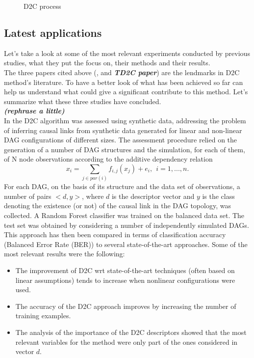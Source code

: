 \begin{figure}[!h]
  
  \caption{D2C process}
  \label{proc}
\end{figure}

\subsection{Latest applications} \label{prev}
Let's take a look at some of the most relevant experiments conducted by previous studies, what they put the focus on, their methods and their results.\\

The three papers cited above (\cite{bontempi2015dependency}, \cite{bontempi2020learning} and \textbf{\textit{TD2C paper}}) are the lendmarks in D2C method's literature. To have a better look of what has been achieved so far can help us understand what could give a significant contribute to this method. Let's summarize what these three studies have concluded.\\

\textbf{\textit{(rephrase a little)}}\\
In \cite{bontempi2015dependency} the D2C algorithm was assessed using synthetic data, addressing the problem of inferring causal links from synthetic data generated for linear and non-linear DAG configurations of different sizes. The assessment procedure relied on the generation of a number of DAG structures and the simulation, for each of them, of N node observations according to the additive dependency relation $$x_i = \sum_{j \in par(i)} f_{i,j}(x_j) + e_i, \ \ i = 1, ..., n.$$ For each DAG, on the basis of its structure and the data set of observations, a number of pairs $<d, y>$, where $d$ is the descriptor vector and $y$ is the class denoting the existence (or not) of the causal link in the DAG topology, was collected. A Random Forest classifier was trained on the balanced data set. The test set was obtained by considering a number of independently simulated DAGs. This approach has then been compared in terms of classification accuracy (Balanced Error Rate (BER)) to several state-of-the-art approaches.
Some of the most relevant results were the following:
\begin{itemize}
    \item The improvement of D2C wrt state-of-the-art techniques (often based on linear assumptions) tends to increase when nonlinear configurations were used.
    \item The accuracy of the D2C approach improves by increasing the number of training examples.
    \item The analysis of the importance of the D2C descriptors showed that the most relevant variables for the method were only part of the ones considered in vector $d$.
\end{itemize}

